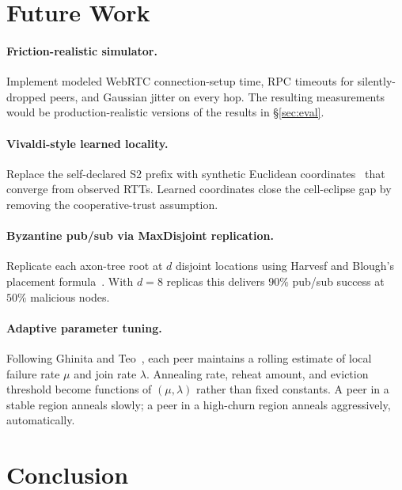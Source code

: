 \documentclass[conference]{IEEEtran}
\begin{document}
\section{Future Work}
\label{sec:future}

\paragraph{Friction-realistic simulator.}
Implement modeled WebRTC connection-setup time, RPC timeouts
for silently-dropped peers, and Gaussian jitter on every hop.
The resulting measurements would be production-realistic
versions of the results in \S\ref{sec:eval}.

\paragraph{Vivaldi-style learned locality.}
Replace the self-declared S2 prefix with synthetic Euclidean
coordinates~\cite{dabek2004vivaldi} that converge from observed
RTTs.  Learned coordinates close the cell-eclipse gap by
removing the cooperative-trust assumption.

\paragraph{Byzantine pub/sub via MaxDisjoint replication.}
Replicate each axon-tree root at $d$ disjoint locations using
Harvesf and Blough's placement formula~\cite{harvesf2007design}.
With $d = 8$ replicas this delivers $90\%$ pub/sub success at
$50\%$ malicious nodes.

\paragraph{Adaptive parameter tuning.}
Following Ghinita and Teo~\cite{ghinita2006adaptive}, each peer
maintains a rolling estimate of local failure rate $\mu$ and
join rate $\lambda$.  Annealing rate, reheat amount, and
eviction threshold become functions of $(\mu, \lambda)$ rather
than fixed constants.  A peer in a stable region anneals
slowly; a peer in a high-churn region anneals aggressively,
automatically.

\section{Conclusion}
\label{sec:conclusion}
\end{document}
